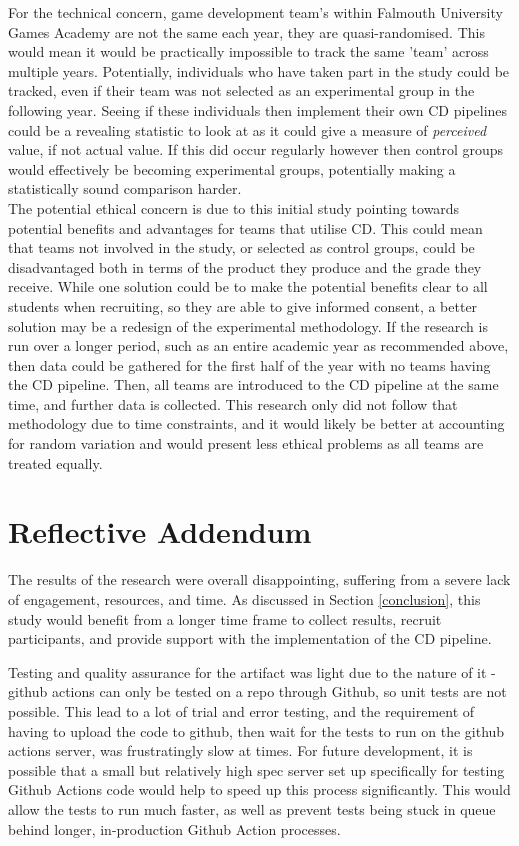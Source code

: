 \documentclass[journal]{IEEEtran}
\begin{document}
    For the technical concern, game development team's within Falmouth University Games Academy are not the same each year, they are quasi-randomised. This would mean it would be practically impossible to track the same 'team' across multiple years. Potentially, individuals who have taken part in the study could be tracked, even if their team was not selected as an experimental group in the following year. Seeing if these individuals then implement their own CD pipelines could be a revealing statistic to look at as it could give a measure of \textit{perceived} value, if not actual value. If this did occur regularly however then control groups would effectively be becoming experimental groups, potentially making a statistically sound comparison harder. \\
    The potential ethical concern is due to this initial study pointing towards potential benefits and advantages for teams that utilise CD. This could mean that teams not involved in the study, or selected as control groups, could be disadvantaged both in terms of the product they produce and the grade they receive. While one solution could be to make the potential benefits clear to all students when recruiting, so they are able to give informed consent, a better solution may be a redesign of the experimental methodology. If the research is run over a longer period, such as an entire academic year as recommended above, then data could be gathered for the first half of the year with no teams having the CD pipeline. Then, all teams are introduced to the CD pipeline at the same time, and further data is collected. This research only did not follow that methodology due to time constraints, and it would likely be better at accounting for random variation and would present less ethical problems as all teams are treated equally.

\section{Reflective Addendum}
    The results of the research were overall disappointing, suffering from a severe lack of engagement, resources, and time. As discussed in Section \ref{conclusion}, this study would benefit from a longer time frame to collect results, recruit participants, and provide support with the implementation of the CD pipeline.

    Testing and quality assurance for the artifact was light due to the nature of it - github actions can only be tested on a repo through Github, so unit tests are not possible. This lead to a lot of trial and error testing, and the requirement of having to upload the code to github, then wait for the tests to run on the github actions server, was frustratingly slow at times. For future development, it is possible that a small but relatively high spec server set up specifically for testing Github Actions code would help to speed up this process significantly. This would allow the tests to run much faster, as well as prevent tests being stuck in queue behind longer, in-production Github Action processes.
    
\end{document}
